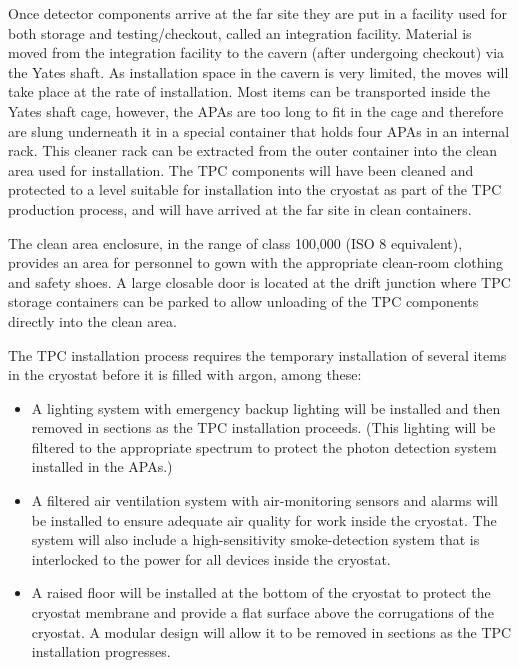 Once detector components arrive at the far site they are put in a
facility used for both storage and testing/checkout, called an integration facility.  
Material is moved from the
integration facility to the cavern (after undergoing checkout)  via the Yates shaft. 
As installation space in
the cavern is very limited, the moves will take place at the rate of installation. 
 Most items can be
transported inside the Yates shaft cage, however, the APAs are too
long to fit in the cage and therefore are slung underneath it in a special %
container that holds four APAs 
in an internal rack. %
This cleaner rack %
can be extracted from the outer container into the clean area used for installation.
The TPC components will have been cleaned and
protected to a level suitable for installation into the cryostat as
part of the TPC production process, and will %
have arrived at the far
site in clean containers.

The clean area enclosure, in the range of class 100,000 (ISO 8
equivalent), %
provides an area for personnel to gown with the appropriate
clean-room clothing and safety shoes. A large closable door is
located at the drift junction where TPC storage containers can be
parked to allow unloading of the TPC components 
directly %
into the clean area. 

The TPC installation process requires the temporary installation of several 
items in the cryostat before it is filled with argon, among these:
\begin{itemize}
\item A lighting system with emergency backup lighting will be installed and then removed in sections
as the TPC installation proceeds. (This lighting will be filtered
to the appropriate spectrum to protect the photon detection system
installed in the APAs.) 
\item A filtered air ventilation system
with air-monitoring sensors and alarms will be installed to ensure adequate air
quality for work inside the cryostat. The system will also include a
high-sensitivity smoke-detection system that is interlocked to the
power for all devices inside the cryostat. 
\item A raised floor will be
installed at the bottom of the cryostat to protect the cryostat
membrane and provide a flat surface above the corrugations of the
cryostat. A modular design will allow it to be removed
in sections as the TPC installation progresses.
\end{itemize}




